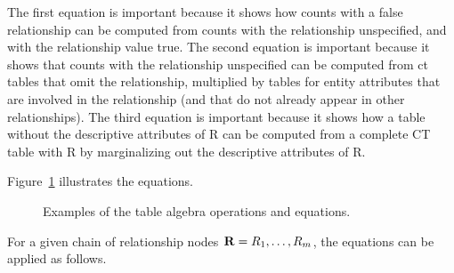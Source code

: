 \documentclass{article}
\begin{document}
The first equation is important because it shows how counts with a false relationship can be computed from counts with the relationship unspecified, and with the relationship value true. The second equation is important because it shows that counts with the relationship unspecified can be computed from ct tables that omit the relationship, multiplied by tables for entity attributes that are involved in the relationship (and that do not already appear in other relationships). The third equation is important because it shows how a table without the descriptive attributes of R can be computed from a complete CT table with R by marginalizing out the descriptive attributes of R.

Figure~\ref{fig:flow} illustrates the equations. 

\begin{figure}[tb]
\begin{center}
\caption{Examples of the table algebra operations and equations.
\label{fig:flow}}
\end{center}
\end{figure}



For a given chain of relationship nodes $\mathbf{R} = R_{1},\ldots,R_{m}$, the equations can be applied as follows. 
\end{document}
